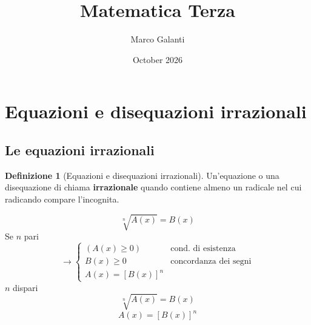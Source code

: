 \documentclass{article}
\title{Matematica Terza}
\author{Marco Galanti}
\date{October 2026}
\theoremstyle{definition}
\newtheorem{definition}{Definizione}
\begin{document}
\maketitle
\tableofcontents
\section{Equazioni e disequazioni irrazionali}
\subsection{Le equazioni irrazionali}
\begin{definition}[Equazioni e disequazioni irrazionali]
    Un'equazione o una disequazione di chiama \textbf{irrazionale} quando contiene almeno un radicale nel cui radicando compare l'incognita.
\end{definition}
$$\sqrt[n]{A\left(x\right)}=B\left(x\right)$$
Se $n$ pari
$$\to \begin{cases}
    (A\left(x\right)\ge0)&\text{cond. di esistenza}\\
    B\left(x\right)\ge0&\text{concordanza dei segni}\\
    A\left(x\right)=\left[B\left(x\right)\right]^n
\end{cases}$$
$n$ dispari
$$\sqrt[n]{A\left(x\right)}=B\left(x\right)$$
$$A\left(x\right)=\left[B\left(x\right)\right]^n$$
\end{document}

